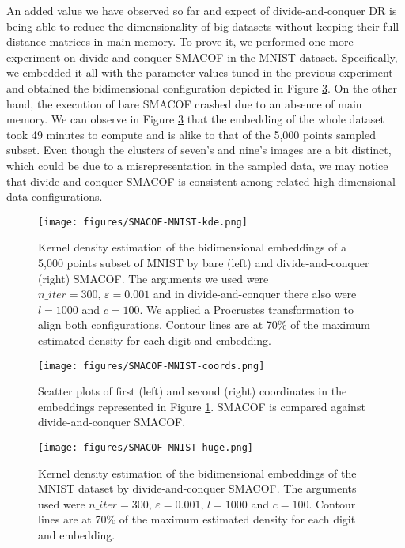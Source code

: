 An added value we have observed so far and expect of divide-and-conquer DR is being able to reduce the dimensionality of big datasets without keeping their full distance-matrices in main memory. To prove it, we performed one more experiment on divide-and-conquer SMACOF in the MNIST dataset. Specifically, we embedded it all with the parameter values tuned in the previous experiment and obtained the bidimensional configuration depicted in Figure \ref{fig:SMACOF-MNIST-huge}. On the other hand, the execution of bare SMACOF crashed due to an absence of main memory. We can observe in Figure \ref{fig:SMACOF-MNIST-huge} that the embedding of the whole dataset took 49 minutes to compute and is alike to that of the 5,000 points sampled subset. Even though the clusters of seven's and nine's images are a bit distinct, which could be due to a misrepresentation in the sampled data, we may notice that divide-and-conquer SMACOF is consistent among related high-dimensional data configurations.

\begin{figure}
    \centering
    \texttt{[image: figures/SMACOF-MNIST-kde.png]}
    \caption{Kernel density estimation of the bidimensional embeddings of a 5,000 points subset of MNIST \citep{Cohen2017} by bare (left) and divide-and-conquer (right) SMACOF. The arguments we used were $n\_iter = 300,\, \varepsilon = 0.001$ and in divide-and-conquer there also were $l=1000$ and $c=100$. We applied a Procrustes transformation to align both configurations. Contour lines are at 70\% of the maximum estimated density for each digit and embedding.}
    \label{fig:SMACOF-MNIST-kde}
\end{figure}

\begin{figure}
    \centering
    \texttt{[image: figures/SMACOF-MNIST-coords.png]}
    \caption{Scatter plots of first (left) and second (right) coordinates in the embeddings represented in Figure \ref{fig:SMACOF-MNIST-kde}. SMACOF is compared against divide-and-conquer SMACOF.}
    \label{fig:SMACOF-MNIST-coords}
\end{figure}

\begin{figure}
    \centering
    \texttt{[image: figures/SMACOF-MNIST-huge.png]}
    \caption{Kernel density estimation of the bidimensional embeddings of the MNIST dataset \citep{Cohen2017} by divide-and-conquer SMACOF. The arguments used were $n\_iter = 300,\, \varepsilon = 0.001, \, l=1000$ and $c=100$. Contour lines are at 70\% of the maximum estimated density for each digit and embedding.}
    \label{fig:SMACOF-MNIST-huge}
\end{figure}

